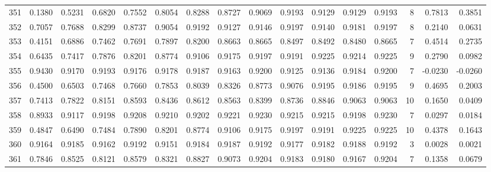 \begin{tabular}{lrrrrrrrrrrrrrrr}
351 &      0.1380 &  0.5231 &  0.6820 &  0.7552 &  0.8054 &  0.8288 &  0.8727 &  0.9069 &  0.9193 &  0.9129 &   0.9129 &     0.9193 &      8 &                    0.7813 &                     0.3851 \\
352 &      0.7057 &  0.7688 &  0.8299 &  0.8737 &  0.9054 &  0.9192 &  0.9127 &  0.9146 &  0.9197 &  0.9140 &   0.9181 &     0.9197 &      8 &                    0.2140 &                     0.0631 \\
353 &      0.4151 &  0.6886 &  0.7462 &  0.7691 &  0.7897 &  0.8200 &  0.8663 &  0.8665 &  0.8497 &  0.8492 &   0.8480 &     0.8665 &      7 &                    0.4514 &                     0.2735 \\
354 &      0.6435 &  0.7417 &  0.7876 &  0.8201 &  0.8774 &  0.9106 &  0.9175 &  0.9197 &  0.9191 &  0.9225 &   0.9214 &     0.9225 &      9 &                    0.2790 &                     0.0982 \\
355 &      0.9430 &  0.9170 &  0.9193 &  0.9176 &  0.9178 &  0.9187 &  0.9163 &  0.9200 &  0.9125 &  0.9136 &   0.9184 &     0.9200 &      7 &                   -0.0230 &                    -0.0260 \\
356 &      0.4500 &  0.6503 &  0.7468 &  0.7660 &  0.7853 &  0.8039 &  0.8326 &  0.8773 &  0.9076 &  0.9195 &   0.9186 &     0.9195 &      9 &                    0.4695 &                     0.2003 \\
357 &      0.7413 &  0.7822 &  0.8151 &  0.8593 &  0.8436 &  0.8612 &  0.8563 &  0.8399 &  0.8736 &  0.8846 &   0.9063 &     0.9063 &     10 &                    0.1650 &                     0.0409 \\
358 &      0.8933 &  0.9117 &  0.9198 &  0.9208 &  0.9210 &  0.9202 &  0.9221 &  0.9230 &  0.9215 &  0.9215 &   0.9198 &     0.9230 &      7 &                    0.0297 &                     0.0184 \\
359 &      0.4847 &  0.6490 &  0.7484 &  0.7890 &  0.8201 &  0.8774 &  0.9106 &  0.9175 &  0.9197 &  0.9191 &   0.9225 &     0.9225 &     10 &                    0.4378 &                     0.1643 \\
360 &      0.9164 &  0.9185 &  0.9162 &  0.9192 &  0.9151 &  0.9184 &  0.9187 &  0.9192 &  0.9177 &  0.9182 &   0.9188 &     0.9192 &      3 &                    0.0028 &                     0.0021 \\
361 &      0.7846 &  0.8525 &  0.8121 &  0.8579 &  0.8321 &  0.8827 &  0.9073 &  0.9204 &  0.9183 &  0.9180 &   0.9167 &     0.9204 &      7 &                    0.1358 &                     0.0679 \\

\end{tabular}
